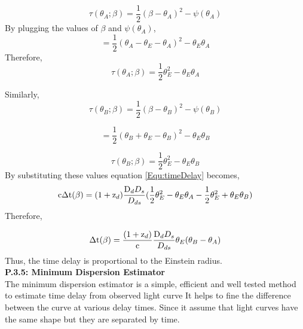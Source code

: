  \begin{equation}
 \tau(\theta_{A}; \beta)=\frac{1}{2}(\beta -\theta_{A})^2 -\psi(\theta_{A})
 \end{equation}
 By plugging the values of $\beta$ and $\psi(\theta_{A})$,
 \begin{equation}
 =\frac{1}{2}(\theta_{A}-\theta_{E} -\theta_{A})^2 -\theta_{E}\theta_{A}
 \end{equation}
 Therefore,
 \begin{equation}
 \tau(\theta_{A}; \beta)=\frac{1}{2}\theta^2_{E} -\theta_{E}\theta_{A}
 \end{equation}
 
  Similarly,
  \begin{equation}
  \tau(\theta_{B}; \beta)=\frac{1}{2}(\beta -\theta_{B})^2 -\psi(\theta_{B})
  \end{equation}
  
   \begin{equation}
   =\frac{1}{2}(\theta_{B}+\theta_{E} -\theta_{B})^2 -\theta_{E}\theta_{B}
   \end{equation}
 
   \begin{equation}
  \tau(\theta_{B}; \beta) =\frac{1}{2}\theta^2_{E} - \theta_{E}\theta_{B}
   \end{equation}
  By substituting these values equation \ref{Equ:timeDelay} becomes, 
 \begin{equation}
 \text{c}\Delta\text{t}(\beta)=(1+ \text{z}_{d})\frac{\text D_{d}D_{s}}{D_{ds}}(\frac{1}{2}\theta^2_{E} -\theta_{E}\theta_{A} - \frac{1}{2}\theta^2_{E} + \theta_{E}\theta_{B})
 \end{equation}
  Therefore,
  
  \begin{equation}
  \Delta\text{t}(\beta)=\frac{(1+ \text{z}_{d})}{\text{c}}\frac{\text D_{d}D_{s}}{D_{ds}}\theta_{E}(\theta_{B}-\theta_{A})
  \end{equation}
  Thus, the time delay is proportional to the Einstein radius.\\
  
  
  
  \textbf{P.3.5: Minimum Dispersion Estimator}\\
  
  \noindent
  The minimum dispersion estimator is a simple, efficient and well tested method to estimate time delay from observed light curve\cite{manual}
  It helps to fine the difference between the curve at various delay times.
  Since it assume that light curves have the same shape but they are separated by time.\\
  
